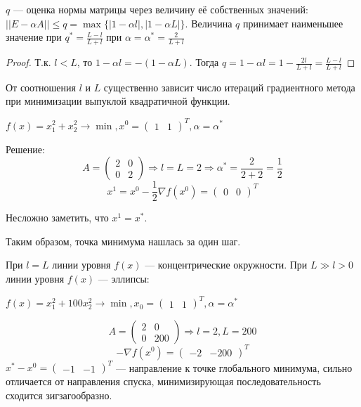 \(q\) --- оценка нормы матрицы через величину её собственных значений: \(||E - \alpha A|| \leq q = \max \{|1 - \alpha l|, |1 - \alpha L|\} \).  Величина \(q\) принимает наименьшее значение при \(q^* = \frac{L - l}{L + l}\) при \(\alpha = \alpha^* = \frac{2}{L + l}\)
\begin{proof}
    Т.к. \(l < L\), то \(1 - \alpha l = -(1 - \alpha L)\). Тогда \(q = 1 - \alpha l = 1 - \frac{2l}{L + l} = \frac{L - l}{L + l}\)
\end{proof}

От соотношения \(l\) и \(L\) существенно зависит число итераций градиентного метода при минимизации выпуклой квадратичной функции.

\begin{example}[\(L = l > 0\)]
    \(f(x) = x_1^2 + x_2^2 \to \min, x^0 = \begin{pmatrix} 1 & 1 \end{pmatrix}^T, \alpha = \alpha^*\)

    Решение:
    \[A = \begin{pmatrix} 2 & 0 \\ 0 & 2 \end{pmatrix} \Rightarrow l = L = 2 \Rightarrow \alpha^* = \frac{2}{2 + 2} = \frac{1}{2}\]
    \[x^1 = x^0 - \frac{1}{2} \nabla f(x^0) = \begin{pmatrix} 0 & 0 \end{pmatrix}^T\]

    Несложно заметить, что \(x^1 = x^*\).

    Таким образом, точка минимума нашлась за один шаг.
\end{example}

При \(l = L\) линии уровня \(f(x)\) --- концентрические окружности. При \(L \gg l > 0\) линии уровня \(f(x)\) --- эллипсы:

\begin{example}[\(L \gg l > 0\)]
    \(f(x) = x_1^2 + 100x_2^2 \to \min , x_0 = \begin{pmatrix} 1 & 1 \end{pmatrix}^T, \alpha = \alpha^*\)

    \[A = \begin{pmatrix} 2 & 0 \\ 0 & 200 \end{pmatrix} \Rightarrow l = 2, L = 200\]
    \[ - \nabla f(x^0) = \begin{pmatrix} - 2 & - 200 \end{pmatrix}^T\]
    \(x^* - x^0 = \begin{pmatrix} - 1 & - 1 \end{pmatrix}^T\) --- направление к точке глобального минимума, сильно отличается от направления спуска, минимизирующая последовательность сходится зигзагообразно.
\end{example}

